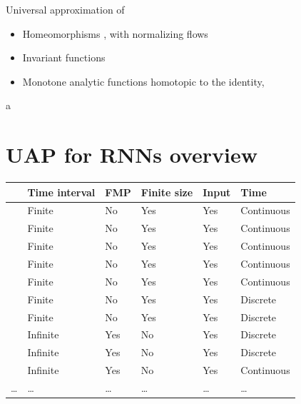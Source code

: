 \documentclass{article}
\theoremstyle{definition} \newtheorem{definition}{Definition}
\theoremstyle{remark} \newtheorem{remark}{Remark}
\newcounter{ct}
\begin{document}
Universal approximation of 
\begin{itemize}
\item Homeomorphisms \citep{zhang2020approximation}, with normalizing flows \citep{papamakarios2021normalizing}
\item Invariant functions\citep{li2022deep}
\item Monotone analytic functions homotopic to the identity\citep{tabuada2020universal}, \citep{tabuada2022universal}
\end{itemize}


a\citep{marchi2021training}





\newpage
\section{UAP for RNNs overview}

\begin{table}[h]
\begin{tabular}{|l|l|l|l|l|l|}
\cline{2-6}
    \multicolumn{1}{c|}{}							%
 						&  Time interval & FMP	& Finite size 		&  Input     	&     Time   \\\cline{2-6}\hline
\citet{cybenko1989approximation} 	& Finite	& No 	& Yes 			&  Yes		&	Continuous\\\hline  %
\citet{funahashi1989approximate} 	& Finite	& No		& Yes			&  Yes		&	Continuous\\\hline  %
\citet{hornik1989multilayer} 		& Finite	& No 	& Yes			& Yes		&	Continuous\\\hline  %
\citet{funahashi1993approximation} 	& Finite	& No		& Yes			&  Yes		&	Continuous\\\hline
\citet{jin1995approximation}		& Finite	& No		& Yes			& Yes		&	Continuous	\\\hline
\citet{hammer2000approximation}	& Finite     & No 	& Yes			& Yes		& 	Discrete	\\\hline
\citet{jin1995universal}			& Finite	& No		& Yes			& Yes		&	Discrete	\\\hline
\citet{bai2019deq} 				& Infinite	& Yes	& No		 	& Yes 			&	Discrete		\\\hline
\citet{schafer2007uap} 			& Infinite 	& Yes	& No			& Yes 			&	Discrete\\\hline
\citet{wang2024state}			& Infinite   & Yes 	& No 		& Yes			& 	Continuous\\\hline %
\dots&\dots &\dots&\dots&\dots&\dots\\
\end{tabular}
\end{table}
\end{document}
